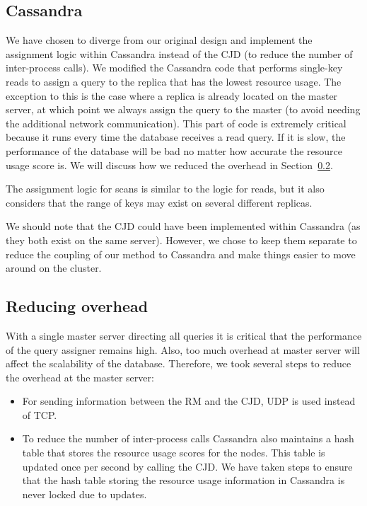 \subsection{Cassandra}
We have chosen to diverge from our original design and implement the assignment logic within Cassandra instead of the CJD (to reduce the number of inter-process calls). We modified the Cassandra code that performs single-key reads to assign a query to the replica that has the lowest resource usage. The exception to this is the case where a replica is already located on the master server, at which point we always assign the query to the master (to avoid needing the additional network communication). This part of code is extremely critical because it runs every time the database receives a read query. If it is slow, the performance of the database will be bad no matter how accurate the resource usage score is. We will discuss how we reduced the overhead in Section~\ref{sec:impl_overhead}.

The assignment logic for scans is similar to the logic for reads, but it also considers that the range of keys may exist on several different replicas.

We should note that the CJD could have been implemented within Cassandra (as they both exist on the same server). However, we chose to keep them separate to reduce the coupling of our method to Cassandra and make things easier to move around on the cluster.

\subsection{Reducing overhead}
\label{sec:impl_overhead}

With a single master server directing all queries it is critical that the performance of the query assigner remains high. Also, too much overhead at master server will affect the scalability of the database. Therefore, we took several steps to reduce the overhead at the master server:

\begin{itemize}
\item For sending information between the RM and the CJD, UDP is used instead of TCP.
\item To reduce the number of inter-process calls Cassandra also maintains a hash table that stores the resource usage scores for the nodes. This table is updated once per second by calling the CJD. We have taken steps to ensure that the hash table storing the resource usage information in Cassandra is never locked due to updates. 
\end{itemize}
